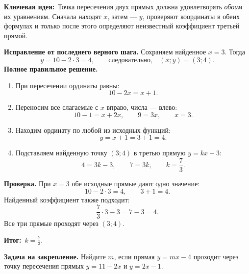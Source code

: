 \documentclass[a4paper,12pt]{article}
\newcommand{\topic}[1]{\textcolor{deepaccent}{\textbf{#1}}}
\newcommand{\idea}{\textcolor{deepaccent}{\textbf{Ключевая идея:}}}
\newcommand{\finalidea}{\textcolor{accent}{\textbf{Итог:}}}
\begin{document}
\idea\ Точка пересечения двух прямых должна удовлетворять \emph{обоим} их уравнениям. Сначала находят $x$, затем --- $y$, проверяют координаты в обеих формулах и только после этого определяют неизвестный коэффициент третьей прямой.

\textbf{Исправление от последнего верного шага.} Сохраняем найденное $x=3$. Тогда
\[
y=10-2\cdot3=4,
\qquad\text{следовательно,}\quad (x;y)=(3;4).
\]
\textbf{Полное правильное решение.}
\begin{enumerate}[leftmargin=*,itemsep=4pt]
\item При пересечении ординаты равны:
\[
10-2x=x+1.
\]
\item Переносим все слагаемые с $x$ вправо, числа --- влево:
\[
10-1=x+2x,\qquad 9=3x,\qquad x=3.
\]
\item Находим ординату по любой из исходных функций:
\[
y=x+1=3+1=4.
\]
\item Подставляем найденную точку $(3;4)$ в третью прямую $y=kx-3$:
\[
4=3k-3,\qquad 7=3k,\qquad k=\frac73.
\]
\end{enumerate}
\textbf{Проверка.} При $x=3$ обе исходные прямые дают одно значение:
\[
10-2\cdot3=4,\qquad 3+1=4.
\]
Найденный коэффициент также подходит:
\[
\frac73\cdot3-3=7-3=4.
\]
Все три прямые проходят через $(3;4)$.

\finalidea\ $\boxed{k=\frac73}$.

\topic{Задача на закрепление.} Найдите $m$, если прямая $y=mx-4$ проходит через точку пересечения прямых $y=11-2x$ и $y=2x-1$.
\endgroup
\end{document}
